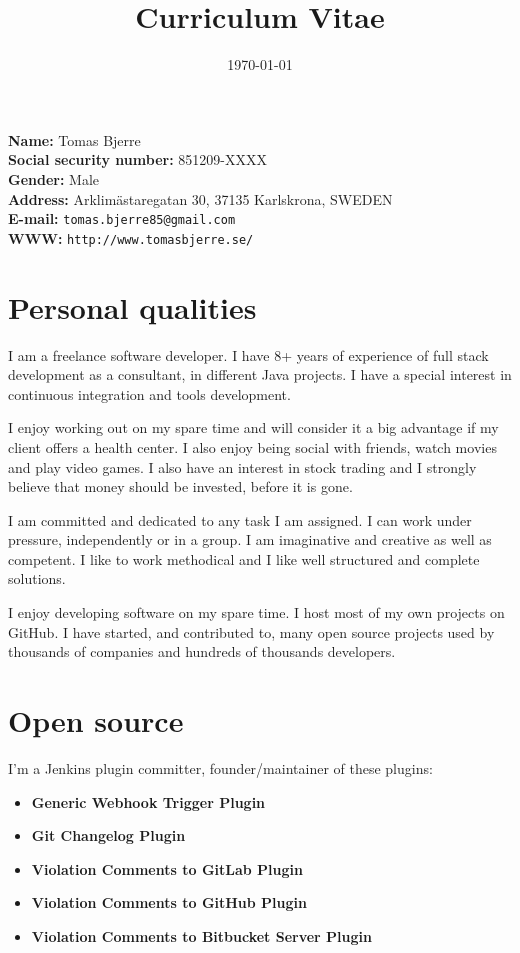 \documentclass[a4paper]{article}
\title{\textbf{Curriculum Vitae}}
\date{\today}
\begin{document}
\maketitle
\thispagestyle{empty}

\textbf{Name:} Tomas Bjerre \\
\textbf{Social security number:} 851209-XXXX \\
\textbf{Gender:} Male \\
\textbf{Address:} Arklim\"astaregatan 30, 37135 Karlskrona, SWEDEN \\
\textbf{E-mail:} \texttt{tomas.bjerre85@gmail.com} \\
\textbf{WWW:} \texttt{http://www.tomasbjerre.se/} \\

\section*{Personal qualities}
I am a freelance software developer. I have 8+ years of experience of full stack development as a consultant, in different Java projects. I have a special interest in continuous integration and tools development.

I enjoy working out on my spare time and will consider it a big advantage if my client offers a health center. I also enjoy being social with friends, watch movies and play video games. I also have an interest in stock trading and I strongly believe that money should be invested, before it is gone.

I am committed and dedicated to any task I am assigned. I can work under pressure, independently or in a group. I am imaginative and creative as well as competent. I like to work methodical and I like well structured and complete solutions.

I enjoy developing software on my spare time. I host most of my own projects on GitHub. I have started, and contributed to, many open source projects used by thousands of companies and hundreds of thousands developers.

\newpage

\section*{Open source}
I'm a Jenkins plugin committer, founder/maintainer of these plugins:

\begin{itemize}
 \item \textbf{Generic Webhook Trigger Plugin}
 \item \textbf{Git Changelog Plugin}
 \item \textbf{Violation Comments to GitLab Plugin}
 \item \textbf{Violation Comments to GitHub Plugin}
 \item \textbf{Violation Comments to Bitbucket Server Plugin}
\end{itemize}
\end{document}
